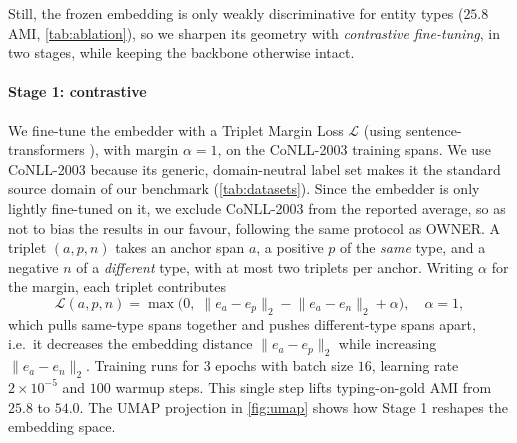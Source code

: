 \label{sec:method:contrastive}
Still, the frozen embedding is only weakly discriminative for entity types ($25.8$ AMI, \autoref{tab:ablation}), so we sharpen its geometry with \emph{contrastive fine-tuning}, in two stages, while keeping the backbone otherwise intact.

\paragraph{Stage 1: contrastive}
We fine-tune the embedder with a Triplet Margin Loss $\mathcal{L}$ \cite{schroff2015facenet} (using sentence-transformers \cite{reimers2019sbert}), with margin $\alpha = 1$, on the CoNLL-2003 \cite{tjongkimsang2003conll} training spans. We use CoNLL-2003 because its generic, domain-neutral label set makes it the standard source domain of our benchmark (\autoref{tab:datasets}). Since the embedder is only lightly fine-tuned on it, we exclude CoNLL-2003 from the reported average, so as not to bias the results in our favour, following the same protocol as OWNER.
A triplet $(a,p,n)$ takes an anchor span $a$, a positive $p$ of the \emph{same} type, and a negative $n$ of a \emph{different} type, with at most two triplets per anchor.
Writing $\alpha$ for the margin, each triplet contributes
\begin{equation}
\mathcal{L}(a,p,n)=\max\!\big(0,\;\lVert e_a-e_p\rVert_2-\lVert e_a-e_n\rVert_2+\alpha\big),\quad \alpha=1,
\end{equation}
which pulls same-type spans together and pushes different-type spans apart, i.e.\ it decreases the embedding distance $\lVert e_a-e_p\rVert_2$ while increasing $\lVert e_a-e_n\rVert_2$.
Training runs for $3$ epochs with batch size $16$, learning rate $2\times10^{-5}$ and $100$ warmup steps.
This single step lifts typing-on-gold AMI from $25.8$ to $54.0$. The UMAP projection in \autoref{fig:umap} shows how Stage 1 reshapes the embedding space.

